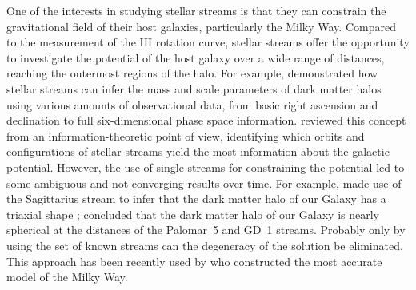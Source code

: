\documentclass{aa}
\begin{document}
  One of the interests in studying stellar streams is that they can constrain the gravitational field of their host galaxies, particularly the Milky Way. Compared to the measurement of the HI rotation curve, stellar streams offer the opportunity to investigate the potential of the host galaxy over a wide range of distances, reaching the outermost regions of the halo. For example, \citet{2011MNRAS.417..198V} demonstrated how stellar streams can infer the mass and scale parameters of dark matter halos using various amounts of observational data, from basic right ascension and declination to full six-dimensional phase space information. \citet{2018ApJ...867..101B} reviewed this concept from an information-theoretic point of view, identifying which orbits and configurations of stellar streams yield the most information about the galactic potential. However, the use of single streams for constraining the potential led to some ambiguous and not converging results over time. For example, \citet{2010ApJ...718.1128L} made use of the Sagittarius stream to infer that the dark matter halo of our Galaxy has a triaxial shape \citep[but see also][]{2004MNRAS.351..643H, 2005ApJ...619..800J, 2005ApJ...619..807L}; \citet{2016ApJ...833...31B} concluded that the dark matter halo of our Galaxy is nearly spherical at the distances of the Palomar~5 and GD~1 streams. Probably only by using the set of known streams can the degeneracy of the solution be eliminated. This approach has been recently used by \citet{2024ApJ...967...89I} who constructed the most accurate model of the Milky Way.


  
\end{document}
